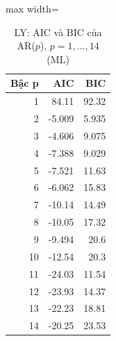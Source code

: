 \begin{table}[H]
\centering\small
\caption{LY: AIC và BIC của AR($p$), $p=1,\dots,14$ (ML)}\label{tab:tab_b11_13_ly_ic}
\begin{adjustbox}{max width=\linewidth}
\begin{tabular}{rrr}
\toprule
Bậc p & AIC & BIC \\
\midrule
1 & 84.11 & 92.32 \\
2 & -5.009 & 5.935 \\
3 & -4.606 & 9.075 \\
4 & -7.388 & 9.029 \\
5 & -7.521 & 11.63 \\
6 & -6.062 & 15.83 \\
7 & -10.14 & 14.49 \\
8 & -10.05 & 17.32 \\
9 & -9.494 & 20.6 \\
10 & -12.54 & 20.3 \\
11 & -24.03 & 11.54 \\
12 & -23.93 & 14.37 \\
13 & -22.23 & 18.81 \\
14 & -20.25 & 23.53 \\
\bottomrule
\end{tabular}
\end{adjustbox}
\end{table}
